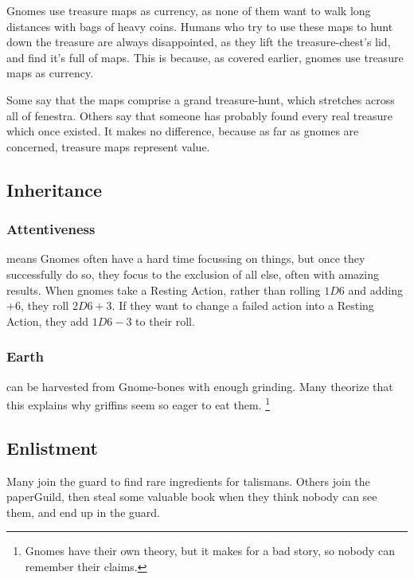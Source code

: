 \begin{multicols}{2}
Gnomes use treasure maps as currency, as none of them want to walk long distances with bags of heavy coins.
Humans who try to use these maps to hunt down the treasure are always disappointed, as they lift the treasure-chest's lid, and find it's full of maps.
This is because, as covered earlier, gnomes use treasure maps as currency.

Some say that the maps comprise a grand treasure-hunt, which stretches across all of \gls{fenestra}.
Others say that someone has probably found every real treasure which once existed.
It makes no difference, because as far as gnomes are concerned, treasure maps represent value.

\subsection{Inheritance}

\subsubsection[Attentiveness: roll 2D6+3 for resting actions]{Attentiveness}
\label{gnomishInheritance}
means Gnomes often have a hard time focussing on things, but once they successfully do so, they focus to the exclusion of all else, often with amazing results.
When gnomes take a Resting Action, rather than rolling $1D6$ and adding +6, they roll $2D6+3$.
If they want to change a failed action into a Resting Action, they add $1D6-3$ to their roll.

\subsubsection{Earth }
can be harvested from Gnome-bones with enough grinding.
Many theorize that this explains why \glspl{griffin} seem so eager to eat them.%
\footnote{Gnomes have their own theory, but it makes for a bad story, so nobody can remember their claims.}

\subsection{Enlistment}

Many join the \gls{guard} to find rare \glspl{ingredient} for \glspl{talisman}.
Others join the \gls{paperGuild}, then steal some valuable book when they think nobody can see them, and end up in the \gls{guard}.


\end{multicols}
